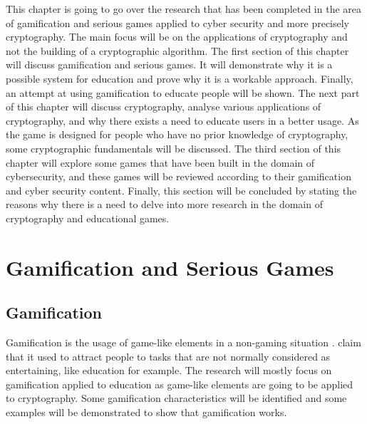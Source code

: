 \documentclass{l4proj}
\begin{document}
This chapter is going to go over the research that has been completed in the area of gamification and serious games applied to cyber security and more precisely cryptography.
The main focus will be on the applications of cryptography and not the building of a cryptographic algorithm.
The first section of this chapter will discuss gamification and serious games. It will demonstrate why it is a possible system for education and prove why it is a workable approach.
Finally, an attempt at using gamification to educate people will be shown.
The next part of this chapter will discuss cryptography, analyse various applications of cryptography, and why there exists a need to educate users in a better usage.
As the game is designed for people who have no prior knowledge of cryptography, some cryptographic fundamentals will be discussed.
The third section of this chapter will explore some games that have been built in the domain of cybersecurity, and these games will be reviewed according to 
their gamification and cyber security content.
Finally, this section will be concluded by stating the reasons why there is a need to delve into more research in the domain of cryptography and educational games.

\section{Gamification and Serious Games}

\subsection{Gamification}
Gamification is the usage of game-like elements in a non-gaming situation \citep{aparicio_analysis_2012}.
\citet{aparicio_analysis_2012} claim that it used to attract people to tasks that are not normally considered as entertaining, like education for example.
The research will mostly focus on gamification applied to education as game-like elements are going to be applied to cryptography.
Some gamification characteristics will be identified and some examples will be demonstrated to show that gamification works.
\end{document}
